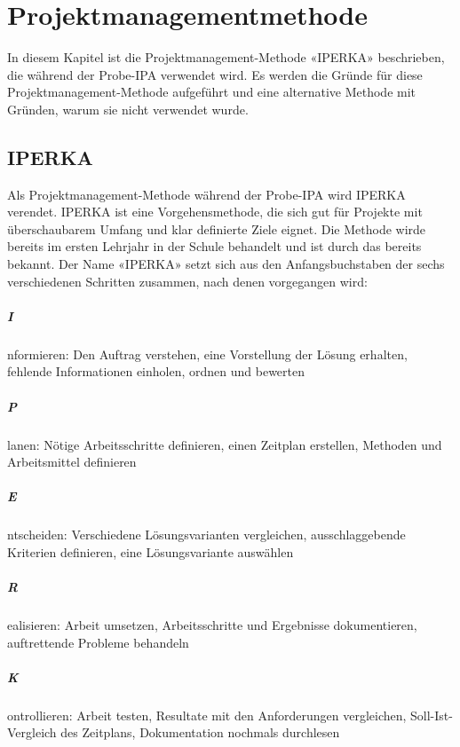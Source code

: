 \chapter{Projektmanagementmethode}\label{ch:projektmanagementmethode}
In diesem Kapitel ist die Projektmanagement-Methode «IPERKA» beschrieben, die während der Probe-IPA verwendet wird. Es werden die Gründe für diese Projektmanagement-Methode aufgeführt und eine alternative Methode mit Gründen, warum sie nicht verwendet wurde.

\section{IPERKA}\label{sec:METHODE}
Als Projektmanagement-Methode während der Probe-IPA wird IPERKA verendet. IPERKA ist eine Vorgehensmethode, die sich gut für Projekte mit überschaubarem Umfang und klar definierte Ziele eignet. Die Methode wirde bereits im ersten Lehrjahr in der Schule behandelt und ist durch das bereits bekannt. Der Name «IPERKA» setzt sich aus den Anfangsbuchstaben der sechs verschiedenen Schritten zusammen, nach denen vorgegangen wird:

\paragraph{I} nformieren: Den Auftrag verstehen, eine Vorstellung der Lösung erhalten, fehlende Informationen einholen, ordnen und bewerten
\paragraph{P} lanen: Nötige Arbeitsschritte definieren, einen Zeitplan erstellen, Methoden und Arbeitsmittel definieren
\paragraph{E} ntscheiden: Verschiedene Lösungsvarianten vergleichen, ausschlaggebende Kriterien definieren, eine Lösungsvariante auswählen
\paragraph{R} ealisieren: Arbeit umsetzen, Arbeitsschritte und Ergebnisse dokumentieren, auftrettende Probleme behandeln
\paragraph{K} ontrollieren: Arbeit testen, Resultate mit den Anforderungen vergleichen, Soll-Ist-Vergleich des Zeitplans, Dokumentation nochmals durchlesen
